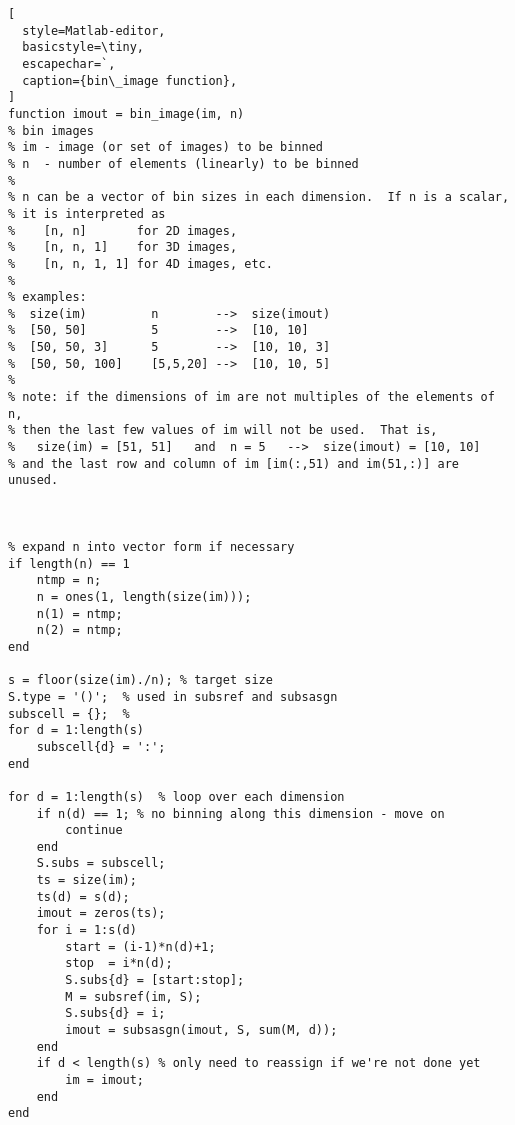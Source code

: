 \begin{lstlisting}[
  style=Matlab-editor,
  basicstyle=\tiny,
  escapechar=`,
  caption={bin\_image function},
]
function imout = bin_image(im, n)
% bin images
% im - image (or set of images) to be binned
% n  - number of elements (linearly) to be binned
%
% n can be a vector of bin sizes in each dimension.  If n is a scalar,
% it is interpreted as 
%    [n, n]       for 2D images, 
%    [n, n, 1]    for 3D images,
%    [n, n, 1, 1] for 4D images, etc.
%
% examples:
%  size(im)         n        -->  size(imout)
%  [50, 50]         5        -->  [10, 10]
%  [50, 50, 3]      5        -->  [10, 10, 3]
%  [50, 50, 100]    [5,5,20] -->  [10, 10, 5]
%
% note: if the dimensions of im are not multiples of the elements of n,
% then the last few values of im will not be used.  That is,
%   size(im) = [51, 51]   and  n = 5   -->  size(imout) = [10, 10]
% and the last row and column of im [im(:,51) and im(51,:)] are unused.



% expand n into vector form if necessary
if length(n) == 1
    ntmp = n;
    n = ones(1, length(size(im)));
    n(1) = ntmp;
    n(2) = ntmp;
end

s = floor(size(im)./n); % target size
S.type = '()';  % used in subsref and subsasgn
subscell = {};  %
for d = 1:length(s)
    subscell{d} = ':';
end

for d = 1:length(s)  % loop over each dimension
    if n(d) == 1; % no binning along this dimension - move on
        continue
    end
    S.subs = subscell;
    ts = size(im);
    ts(d) = s(d);
    imout = zeros(ts);
    for i = 1:s(d)
        start = (i-1)*n(d)+1;
        stop  = i*n(d);
        S.subs{d} = [start:stop];
        M = subsref(im, S);
        S.subs{d} = i;
        imout = subsasgn(imout, S, sum(M, d));
    end
    if d < length(s) % only need to reassign if we're not done yet
        im = imout;
    end
end

\end{lstlisting}